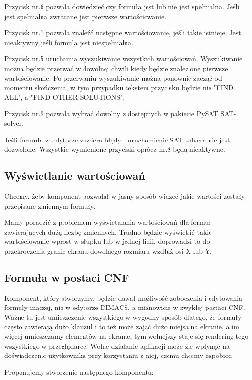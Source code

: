\documentclass[a4paper,12pt,oneside]{book}
\theoremstyle{definition}
\begin{document}
Przycisk nr.6 pozwala dowiedzieć czy formuła jest lub nie jest spełnialna. Jeśli jest spełnialna zwracane jest pierwsze wartościowanie.

Przycisk nr.7 pozwala znaleźć następne wartościowanie, jeśli takie istnieje. Jest nieaktywny jeśli formula jest niespełnialna.

Przycisk nr.5 uruchamia wyszukiwanie wszystkich wartościowań. Wyszukiwanie można będzie przerwać w dowolnej chwili kiedy będzie znalezione pierwsze wartościowanie. Po przerwaniu wyszukiwanie można ponownie zacząć od momentu skończenia, w tym przypadku tekstem przycisku będzie nie "FIND ALL", a "FIND OTHER SOLUTIONS".

Przycisk nr.8 pozwala wybrać dowolny z dostępnych w pakiecie PySAT SAT-solver.

Jeśli formuła w edytorze zawiera błędy - uruchomienie SAT-solvera nie jest dozwolone. Wszystkie wymienione przyciski oprócz nr.8 będą nieaktywne.

\subsection{Wyświetlanie wartościowań}

Chcemy, żeby komponent pozwalał w jasny sposób widzeć jakie wartości zostały przepisane zmiennym formuły.

Mamy poradzić z problemem wyświetalania wartościowań dla formuł zawierających dużą liczbę zmiennych. Trudno będzie wyświetlić takie wartościowanie wprost w słupku lub w jednej linii, doprowadzi to do przekroczenia granic ekranu dowolnego rozmiaru wzdłuż osi X lub Y. 


\subsection{Formuła w postaci CNF}

Komponent, który stworzymy, będzie dawał możliwość zoboczenia i edytowania formuły inaczej, niż w edytorze DIMACS, a mianowicie w zwykłej postaci CNF. Ważne tu jest umieszczenie wszystkiego w wygodny sposób dlatego, że formuły często zawierają dużo klauzul i to też może zająć dużo miejsa na ekranie, a im więcej umieszczamy elementów na ekranie, tym wolnejszy staje się rendering tego wszystkiego w przeglądarce. Wolne działanie aplikacji może źle wpłynąć na doświadczenie użytkownika przy korzystaniu z niej, czemu chcemy zapobiec.

Proponujemy stworzenie następnego komponentu:
\end{document}
